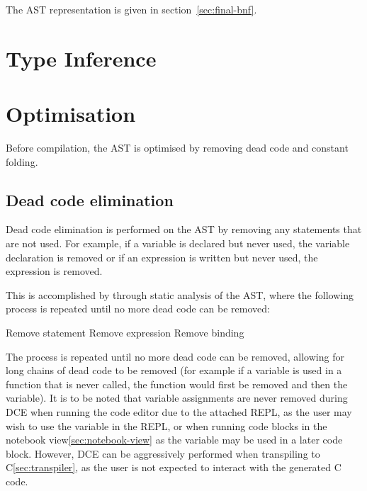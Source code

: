 The AST representation is given in section~\ref{sec:final-bnf}.

\section{Type Inference}\label{sec:type-inference}


\section{Optimisation}\label{sec:optimisation}

Before compilation, the AST is optimised by removing dead code and constant folding.

\subsection{Dead code elimination}\label{subsec:dead-code-elimination}

Dead code elimination is performed on the AST by removing any statements that are not used.
For example, if a variable is declared but never used, the variable declaration is removed or if an expression is
written but never used, the expression is removed.

This is accomplished by through static analysis of the AST, where the following process is repeated until no more dead
code can be removed:

\begin{algorithmic}
                    \State Remove statement
                \EndIf
                    \State Remove expression
                \EndIf
                    \State Remove binding
                \EndIf
            \EndIf
        \EndFor
    \EndWhile
\end{algorithmic}

The process is repeated until no more dead code can be removed, allowing for long chains of dead code to be 
removed (for example if a variable is used in a function that is never called, the function would first be removed
and then the variable).
It is to be noted that variable assignments are never removed during DCE when running the code editor due to the 
attached REPL, as the user may wish to use the variable in the REPL\@, or when running code blocks in the notebook 
view\ref{sec:notebook-view} as the variable may be used in a later code block.
However, DCE can be aggressively performed when transpiling to C\ref{sec:transpiler}, as the user is not expected to 
interact with the generated C code.


